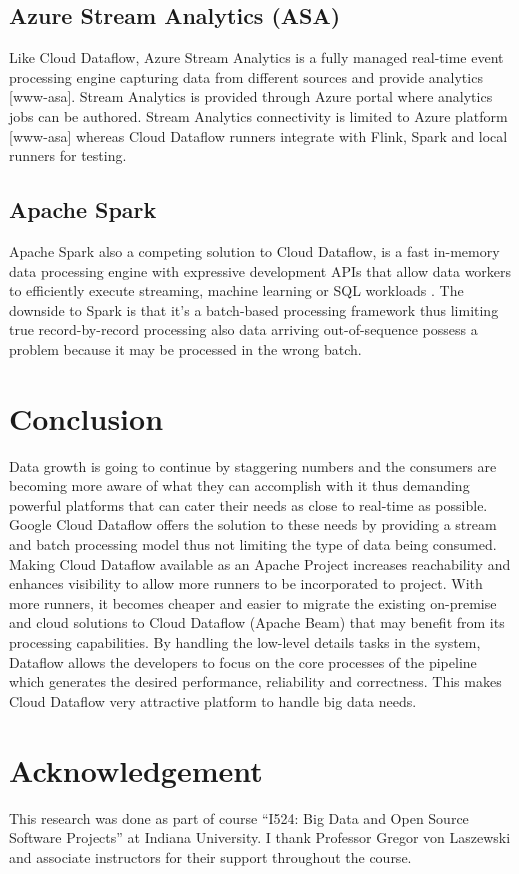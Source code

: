 \documentclass[9pt,twocolumn,twoside]{../../styles/osajnl}
\begin{document}
\subsection{Azure Stream Analytics (ASA)}

Like Cloud Dataflow, Azure Stream Analytics is a fully managed
real-time event processing engine capturing data from different
sources and provide analytics [www-asa]. Stream Analytics is provided
through Azure portal where analytics jobs can be authored. Stream
Analytics connectivity is limited to Azure platform [www-asa] whereas
Cloud Dataflow runners integrate with Flink, Spark and local runners
for testing.

\subsection{Apache Spark}

Apache Spark also a competing solution to Cloud Dataflow, is a fast
in-memory data processing engine with expressive development APIs that
allow data workers to efficiently execute streaming, machine learning
or SQL workloads \cite{www-spark}. The downside to Spark is that it’s
a batch-based processing framework \cite{www-notstream} thus limiting
true record-by-record processing also data arriving out-of-sequence
possess a problem because it may be processed in the wrong batch.

\section{Conclusion}

Data growth is going to continue by staggering numbers and the
consumers are becoming more aware of what they can accomplish with it
thus demanding powerful platforms that can cater their needs as close
to real-time as possible. Google Cloud Dataflow offers the solution to
these needs by providing a stream and batch processing model thus not
limiting the type of data being consumed. Making Cloud Dataflow
available as an Apache Project increases reachability and enhances
visibility to allow more runners to be incorporated to project. With
more runners, it becomes cheaper and easier to migrate the existing
on-premise and cloud solutions to Cloud Dataflow (Apache Beam) that
may benefit from its processing capabilities.  By handling the
low-level details tasks in the system, Dataflow allows the developers
to focus on the core processes of the pipeline which generates the
desired performance, reliability and correctness. This makes Cloud
Dataflow very attractive platform to handle big data needs.

\section{Acknowledgement}

This research was done as part of course “I524: Big Data and Open
Source Software Projects” at Indiana University. I thank Professor
Gregor von Laszewski and associate instructors for their support
throughout the course.



 
\end{document}
